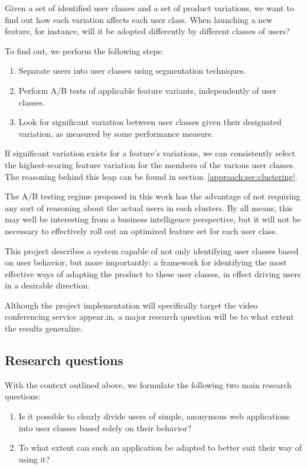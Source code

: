 Given a set of identified user classes and a set of product variations, we want to find out how each variation affects each user class. When launching a new feature, for instance, will it be adopted differently by different classes of users?

To find out, we perform the following steps:

\begin{enumerate}
  \item Separate users into user classes using segmentation techniques.
  \item Perform A/B tests of applicable feature variants, independently of user classes.
  \item Look for significant variation between user classes given their designated variation, as measured by some performance measure.
\end{enumerate}

If significant variation exists for a feature's variations, we can consistently select the highest-scoring feature variation for the members of the various user classes. The reasoning behind this leap can be found in section~\ref{approach:sec:clustering}.

The A/B testing regime proposed in this work has the advantage of not requiring any sort of reasoning about the actual users in each clusters. By all means, this may well be interesting from a business intelligence perspective, but it will not be necessary to effectively roll out an optimized feature set for each user class.

This project describes a system capable of not only identifying user classes based on user behavior, but more importantly: a framework for identifying the most effective ways of adapting the product to these user classes, in effect driving users in a desirable direction.

Although the project implementation will specifically target the video conferencing service appear.in, a major research question will be to what extent the results generalize.

\subsection{Research questions}
\label{sub:research_questions}

With the context outlined above, we formulate the following two main research questions:

\begin{enumerate}
  \item Is it possible to clearly divide users of simple, anonymous web applications into user classes based solely on their behavior?
  \item To what extent can such an application be adapted to better suit their way of using it?
\end{enumerate}

